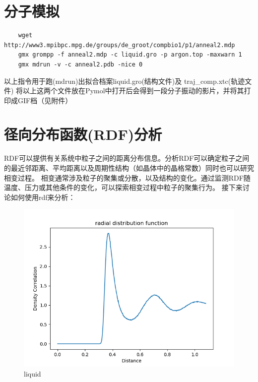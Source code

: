 \documentclass[12pt, a4paper, oneside]{ctexart}
\begin{document}
\begin{spacing}{2.0}
\section{分子模拟}
\begin{lstlisting}
    wget http://www3.mpibpc.mpg.de/groups/de_groot/compbio1/p1/anneal2.mdp
    gmx grompp -f anneal2.mdp -c liquid.gro -p argon.top -maxwarn 1
    gmx mdrun -v -c anneal2.pdb -nice 0
\end{lstlisting}
以上指令用于跑(mdrun)出拟合档案liquid.gro(结构文件)及 traj\_comp.xtc(轨迹文件)
将以上这两个文件放在Pymol中打开后会得到一段分子振动的影片，并将其打印成GIF档（见附件）
\section{径向分布函数(RDF)分析}
RDF可以提供有关系统中粒子之间的距离分布信息。分析RDF可以确定粒子之间的最近邻距离、平均距离以及周期性结构（如晶体中的晶格常数）同时也可以研究相变过程。
相变通常涉及粒子的聚集或分散，以及结构的变化。通过监测RDF随温度、压力或其他条件的变化，可以探索相变过程中粒子的聚集行为。
接下来讨论如何使用rdf来分析：
\begin{figure}[H]
    \begin{minipage}[t]{0.5\linewidth}
        \centering
        \includegraphics[scale=0.5]{radial distribution function.png}
        \caption{liquid}
        \label{fig:side:a}
      \end{minipage}%
      \begin{minipage}[t]{0.5\linewidth}
        \centering

\end{minipage}
\end{figure}
\end{spacing}
\end{document}
